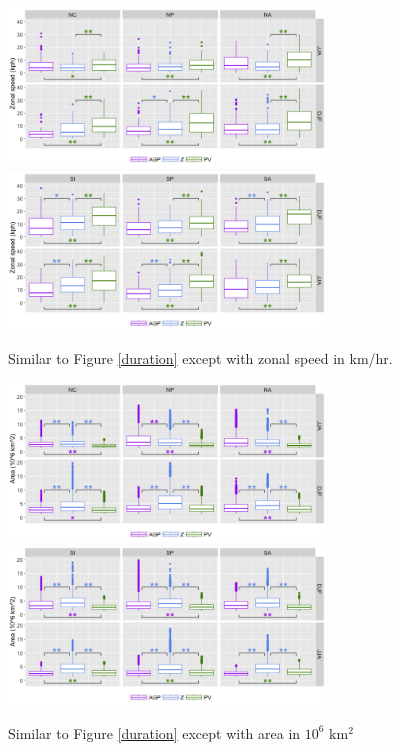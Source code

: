 \documentclass[smallextended]{svjour3}       %
\numberwithin{equation}{section}
\begin{document}
\begin{figure}
    \centering
    \includegraphics[width=0.75\textwidth]{fig9a.png}
        \includegraphics[width=0.75\textwidth]{fig9b.png}
    \caption{Similar to Figure \ref{duration} except with zonal speed in km/hr.}
    \label{shspeed}
\end{figure}

\begin{figure}
    \centering
    \includegraphics[width=0.75\textwidth]{fig10a.png}
    \includegraphics[width=0.75\textwidth]{fig10b.png}
    \caption{Similar to Figure \ref{duration} except with area in $10^6$ km$^2$}
    \label{size}
\end{figure} 
\end{document}
